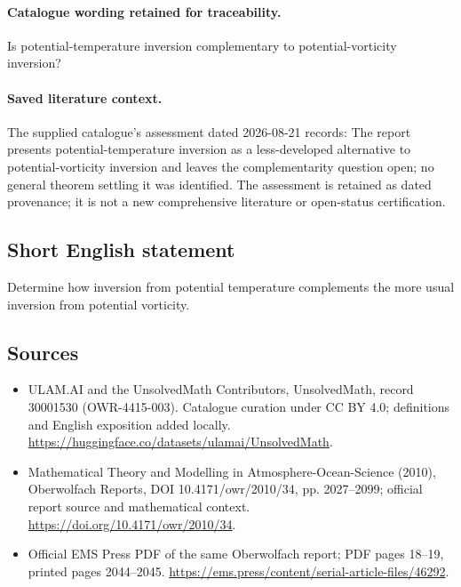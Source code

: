 \documentclass[11pt]{article}
\begin{document}
\paragraph{Catalogue wording retained for traceability.}
Is potential-temperature inversion complementary to potential-vorticity inversion?

\paragraph{Saved literature context.} The supplied catalogue's assessment dated 2026-08-21 records: The report presents potential-temperature inversion as a less-developed alternative to potential-vorticity inversion and leaves the complementarity question open; no general theorem settling it was identified. The assessment is retained as dated provenance; it is not a new comprehensive literature or open-status certification.
\subsection{Short English statement}
Determine how inversion from potential temperature complements the more usual inversion from potential vorticity.
\subsection{Sources}
\begin{itemize}
\item[\hypertarget{source:30001530:1}{S1}] ULAM.AI and the UnsolvedMath Contributors, UnsolvedMath, record 30001530 (OWR-4415-003). Catalogue curation under CC BY 4.0; definitions and English exposition added locally.
\url{https://huggingface.co/datasets/ulamai/UnsolvedMath}.
\item[\hypertarget{source:30001530:2}{S2}] Mathematical Theory and Modelling in Atmosphere-Ocean-Science (2010), Oberwolfach Reports, DOI 10.4171/owr/2010/34, pp. 2027--2099; official report source and mathematical context.
\url{https://doi.org/10.4171/owr/2010/34}.
\item[\hypertarget{source:30001530:3}{S3}] Official EMS Press PDF of the same Oberwolfach report; PDF pages 18--19, printed pages 2044--2045.
\url{https://ems.press/content/serial-article-files/46292}.
\end{itemize}
\label{end:30001530}
\end{document}
